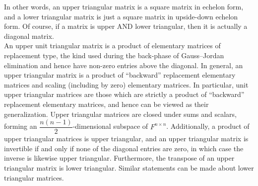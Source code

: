 \begin{center}
\end{center}

In other words, an upper triangular matrix is a square matrix in echelon form, and a lower triangular matrix is just a square matrix in upside-down echelon form\footnotemark[2]. Of course, if a matrix is upper AND lower triangular, then it is actually a diagonal matrix.\\

An upper unit triangular matrix is a product of elementary matrices of replacement type, the kind used during the back-phase of Gauss--Jordan elimination and hence have non-zero entries above the diagonal. In general, an upper triangular matrix is a product of ``backward'' replacement elementary matrices and scaling (including by zero) elementary matrices. In particular, unit upper triangular matrices are those which are strictly a product of ``backward'' replacement elementary matrices, and hence can be viewed as their generalization. Upper triangular matrices are closed under sums and scalars, forming an $\dfrac{n(n-1)}{2}$-dimensional subspace of $F^{n\times n}$. Additionally, a product of upper triangular matrices is upper triangular, and an upper triangular matrix is invertible if and only if none of the diagonal entries are zero, in which case the inverse is likewise upper triangular. Furthermore, the transpose of an upper triangular matrix is lower triangular. Similar statements can be made about lower triangular matrices.\\

